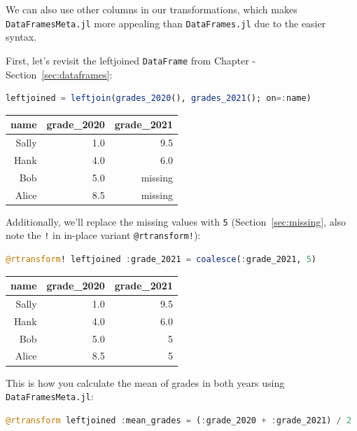 \documentclass[
  notoc %
]{tufte-book}
\newcommand{\passthrough}[1]{#1}
\begin{document}
We can also use other columns in our transformations, which makes
\passthrough{\lstinline!DataFramesMeta.jl!} more appealing than
\passthrough{\lstinline!DataFrames.jl!} due to the easier syntax.

First, let's revisit the leftjoined \passthrough{\lstinline!DataFrame!}
from Chapter -Section~\ref{sec:dataframes}:

\begin{lstlisting}[language=Julia]
leftjoined = leftjoin(grades_2020(), grades_2021(); on=:name)
\end{lstlisting}

\begin{longtable}[]{@{}rrr@{}}
\toprule()
name & grade\_2020 & grade\_2021 \\
\midrule()
\endhead
Sally & 1.0 & 9.5 \\
Hank & 4.0 & 6.0 \\
Bob & 5.0 & missing \\
Alice & 8.5 & missing \\
\bottomrule()
\end{longtable}

Additionally, we'll replace the missing values with
\passthrough{\lstinline!5!} (Section~\ref{sec:missing}, also note the
\passthrough{\lstinline"!"} in in-place variant
\passthrough{\lstinline"@rtransform!"}):

\begin{lstlisting}[language=Julia]
@rtransform! leftjoined :grade_2021 = coalesce(:grade_2021, 5)
\end{lstlisting}

\begin{longtable}[]{@{}rrr@{}}
\toprule()
name & grade\_2020 & grade\_2021 \\
\midrule()
\endhead
Sally & 1.0 & 9.5 \\
Hank & 4.0 & 6.0 \\
Bob & 5.0 & 5 \\
Alice & 8.5 & 5 \\
\bottomrule()
\end{longtable}

This is how you calculate the mean of grades in both years using
\passthrough{\lstinline!DataFramesMeta.jl!}:

\begin{lstlisting}[language=Julia]
@rtransform leftjoined :mean_grades = (:grade_2020 + :grade_2021) / 2
\end{lstlisting}
\end{document}
